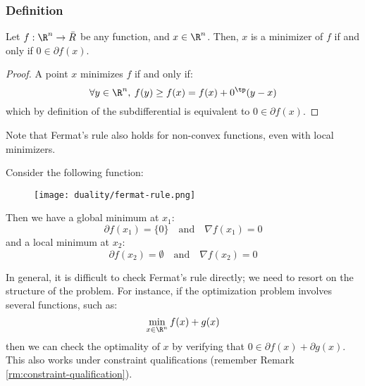 \subsubsection{Definition}
\begin{theorem}
    Let $f:\R^n\to\bar{R}$ be any function, and $x\in\R^n$. Then, $x$ is a minimizer of $f$ if and only if $0\in\partial f(x)$.
\end{theorem}
\begin{proof}
    A point $x$ minimizes $f$ if and only if:
    \begin{equation*}
        \forall y\in\R^n, \: f(y)\geq f(x) = f(x) + 0^\tp(y-x)
    \end{equation*}
    which by definition of the subdifferential is equivalent to $0\in\partial f(x)$.
\end{proof}
Note that Fermat's rule also holds for non-convex functions, even with local minimizers.

\begin{example}
    Consider the following function:
    \begin{figure}[H]
        \centering
        \texttt{[image: duality/fermat-rule.png]}
    \end{figure}
    Then we have a global minimum at $x_1$:
    \begin{equation*}
        \partial f(x_1) = \{0\} \quad\text{and}\quad \nabla f(x_1)=0
    \end{equation*}
    and a local minimum at $x_2$:
    \begin{equation*}
        \partial f(x_2) = \emptyset \quad\text{and}\quad \nabla f(x_2)=0
    \end{equation*}
\end{example}

In general, it is difficult to check Fermat's rule directly; we need to resort on the structure of the problem. For instance, if the optimization problem involves several functions, such as:
\begin{equation*}
    \min_{x\in\R^n} f(x) + g(x)
\end{equation*}
then we can check the optimality of $x$ by verifying that $0\in\partial f(x) + \partial g(x)$. This also works under constraint qualifications (remember Remark \ref{rm:constraint-qualification}).

